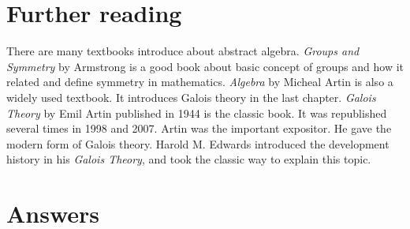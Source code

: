 \documentclass[b5paper]{article}
\begin{document}
\begin{Exercise}
\end{Exercise}

\section{Further reading}

There are many textbooks introduce about abstract algebra. {\em Groups and Symmetry} by Armstrong is a good book about basic concept of groups and how it related and define symmetry in mathematics. {\em Algebra} by Micheal Artin is also a widely used textbook. It introduces Galois theory in the last chapter. {\em Galois Theory} by Emil Artin published in 1944 is the classic book. It was republished several times in 1998 and 2007. Artin was the important expositor. He gave the modern form of Galois theory. Harold M. Edwards introduced the development history in his {\em Galois Theory}, and took the classic way to explain this topic.

\ifx\wholebook\relax \else
\section{Answers}
\shipoutAnswer
\end{document}
